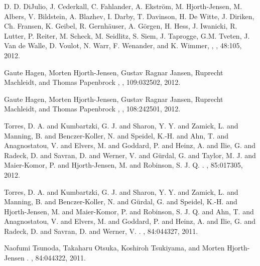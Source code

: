 \begin{thebibliography}{200}
 D. D. DiJulio, J. Cederkall, C. Fahlander, A. Ekstr\"om, M. Hjorth-Jensen, M. Albers, V. Bildstein,
A. Blazhev, I. Darby, T. Davinson, H. De Witte, J. Diriken, Ch. Fransen, K. Geibel, R. Gernh\"auser,
A. G\"orgen, H. Hess, J. Iwanicki, R. Lutter, P. Reiter, M. Scheck, M. Seidlitz, S. Siem, J. Taprogge,
G.M. Tveten, J. Van de Walle, D. Voulot, N. Warr, F. Wenander, and K. Wimmer,
, 
, 48:105,  2012.


Gaute Hagen, Morten Hjorth-Jensen, Gustav Ragnar Jansen, Ruprecht Machleidt, and Thomas Papenbrock
, 
, 109:032502, 2012.

Gaute Hagen, Morten Hjorth-Jensen, Gustav Ragnar Jansen, Ruprecht Machleidt, and Thomas Papenbrock
, 
, 108:242501, 2012.


Torres, D. A. and Kumbartzki, G. J. and Sharon, Y. Y. and Zamick,
	L. and Manning, B. and Benczer-Koller, N. and Speidel, K.-H. and
	Ahn, T. and Anagnostatou, V. and Elvers, M. and Goddard, P. and Heinz,
	A. and Ilie, G. and Radeck, D. and Savran, D. and Werner, V. and
	G\"urdal, G. and Taylor, M. J. and Maier-Komor, P. and Hjorth-Jensen,
	M. and Robinson, S. J. Q.
.
, 85:017305, 2012.


Torres, D. A. and Kumbartzki, G. J. and Sharon, Y. Y. and Zamick,
	L. and Manning, B. and Benczer-Koller, N. and G\"urdal, G. and Speidel,
	K.-H. and Hjorth-Jensen, M. and Maier-Komor, P. and Robinson, S.
	J. Q. and Ahn, T. and Anagnostatou, V. and Elvers, M. and Goddard,
	P. and Heinz, A. and Ilie, G. and Radeck, D. and Savran, D. and Werner,
	V.
.
, 84:044327, 2011.


Naofumi Tsunoda, Takaharu Otsuka, Koshiroh Tsukiyama, and Morten Hjorth-Jensen
.
, 84:044322, 2011.



\end{thebibliography}
